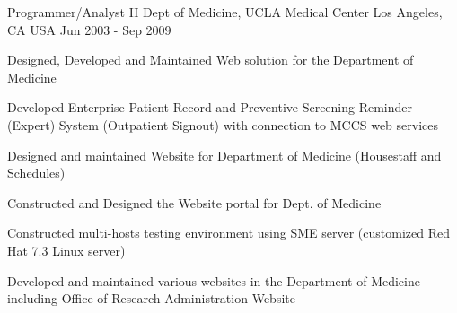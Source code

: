 \begin{cventries}
 \cventry
    {Programmer/Analyst II} %
    {Dept of Medicine, UCLA Medical Center} %
    {Los Angeles, CA USA} %
    {Jun 2003 - Sep 2009} %
    {
      \begin{cvitems} %
        \item {Designed, Developed and Maintained Web solution for the Department of Medicine}
		 \item {Developed Enterprise Patient Record and Preventive Screening Reminder (Expert) System (Outpatient Signout) with connection to MCCS web services}
		  \item {Designed and maintained Website for Department of Medicine (Housestaff and Schedules)}
		  \item {Constructed and Designed the Website portal for Dept. of Medicine}
		   \item {Constructed multi-hosts testing environment using SME server (customized Red Hat 7.3 Linux server)}
		   \item {Developed and maintained various websites in the Department of Medicine including Office of Research Administration Website}
      \end{cvitems}
    }


\end{cventries}
